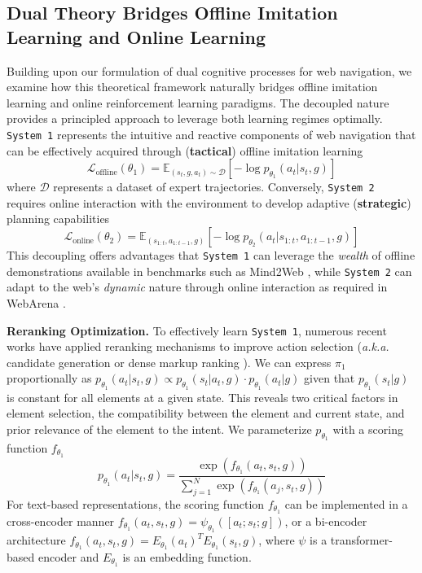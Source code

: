\documentclass{article}
\begin{document}
\subsection{Dual Theory Bridges Offline Imitation Learning and Online Learning}
\label{sec2.3}

Building upon our formulation of dual cognitive processes for web navigation, we examine how this theoretical framework naturally bridges offline imitation learning and online reinforcement learning paradigms. The decoupled nature provides a principled approach to leverage both learning regimes optimally. \texttt{System 1} represents the intuitive and reactive components of web navigation that can be effectively acquired through (\textbf{tactical}) offline imitation learning
\begin{equation}
\mathcal{L}_{\text{offline}}(\theta_1) = \mathbb{E}_{(s_t,g,a_t) \sim \mathcal{D}} [-\log p_{\theta_1}(a_t|s_t,g)]
\end{equation}
where $\mathcal{D}$ represents a dataset of expert trajectories. Conversely, \texttt{System 2} requires online interaction with the environment to develop adaptive (\textbf{strategic}) planning capabilities
\begin{equation}
\mathcal{L}_{\text{online}}(\theta_2) = \mathbb{E}_{(s_{1:t},a_{1:t-1},g)} [-\log p_{\theta_2}(a_t|s_{1:t},a_{1:t-1},g)]
\end{equation}
This decoupling offers advantages that \texttt{System 1} can leverage the \textit{wealth} of offline demonstrations available in benchmarks such as Mind2Web \citep{deng2023mind2web}, while \texttt{System 2} can adapt to the web's \textit{dynamic} nature through online interaction as required in WebArena \citep{zhou2023webarena}.

\textbf{Reranking Optimization.} To effectively learn \texttt{System 1}, numerous recent works have applied reranking mechanisms to improve action selection (\textit{a.k.a.} candidate generation \citep{deng2023mind2web} or dense markup ranking \citep{lu2024weblinx}). We can express $\pi_1$ proportionally as $p_{\theta_1}(a_t|s_t, g) \propto p_{\theta_1}(s_t|a_t, g) \cdot p_{\theta_1}(a_t|g)$ given that $p_{\theta_1}(s_t|g)$  is constant for all elements at a given state. This reveals two critical factors in element selection, the compatibility between the element and current state, and prior relevance of the element to the intent. We parameterize $p_{\theta_1}$ with a scoring function $f_{\theta_1}$
\begin{equation}
p_{\theta_1}(a_t|s_t, g) = \frac{\exp(f_{\theta_1}(a_t, s_t, g))}{\sum_{j=1}^{N} \exp(f_{\theta_1}(a_j, s_t, g))}
\end{equation}
For text-based representations, the scoring function $f_{\theta_1}$ can be implemented in a cross-encoder manner \citep{devlin2019bert} $f_{\theta_1}(a_t, s_t, g) = \psi_{\theta_1}([a_t; s_t; g])$, or a bi-encoder architecture $f_{\theta_1}(a_t, s_t, g) = E_{\theta_1}(a_t)^T E_{\theta_1}(s_t, g)$, where $\psi$ is a transformer-based encoder and $E_{\theta_1}$ is an embedding function.
\end{document}
